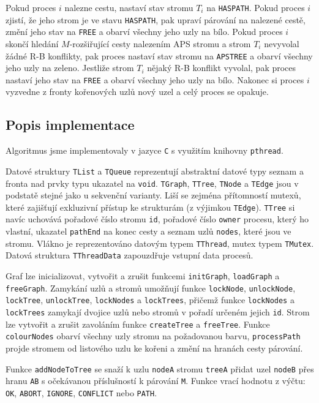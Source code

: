\documentclass[a4paper, 11pt, titlepage, final]{article}[3. prosinec 2011]
\begin{document}
Pokud proces $i$ nalezne cestu, nastaví stav stromu $T_i$ na \texttt{HASPATH}. Pokud proces $i$ zjistí, že jeho strom je ve stavu \texttt{HASPATH}, pak upraví párování na nalezené cestě, změní jeho stav na \texttt{FREE} a obarví všechny jeho uzly na bílo. Pokud proces $i$ skončí hledání $M$-rozšiřující cesty nalezením APS stromu a strom $T_i$ nevyvolal žádné R-B konflikty, pak proces nastaví stav stromu na \texttt{APSTREE} a obarví všechny jeho uzly na zeleno. Jestliže strom $T_i$ nějaký R-B konflikt vyvolal, pak proces nastaví jeho stav na \texttt{FREE} a obarví všechny jeho uzly na bílo. Nakonec si proces $i$ vyzvedne z fronty kořenových uzlů nový uzel a celý proces se opakuje.

\subsection{Popis implementace}

Algoritmus jsme implementovaly v jazyce \texttt{C} s využitím knihovny \texttt{pthread}. 

Datové struktury \texttt{TList} a \texttt{TQueue} reprezentují abstraktní datové typy seznam a fronta nad prvky typu ukazatel na \texttt{void}. \texttt{TGraph}, \texttt{TTree}, \texttt{TNode} a \texttt{TEdge} jsou v podstatě stejné jako u sekvenční varianty. Liší se zejména přítomností mutexů, které zajišťují exkluzivní přístup ke strukturám (z výjimkou \texttt{TEdge}). \texttt{TTree} si navíc uchovává pořadové číslo stromu \texttt{id}, pořadové číslo \texttt{owner} procesu, který ho vlastní, ukazatel \texttt{pathEnd} na konec cesty a seznam uzlů \texttt{nodes}, které jsou ve stromu. Vlákno je reprezentováno datovým typem \texttt{TThread}, mutex typem \texttt{TMutex}. Datová struktura \texttt{TThreadData} zapouzdřuje vstupní data procesů.

Graf lze inicializovat, vytvořit a zrušit funkcemi \texttt{initGraph}, \texttt{loadGraph} a \texttt{freeGraph}. Zamykání uzlů a stromů umožňují funkce \texttt{lockNode}, \texttt{unlockNode}, \texttt{lockTree}, \texttt{unlockTree}, \texttt{lockNodes} a \texttt{lockTrees}, přičemž funkce \texttt{lockNodes} a \texttt{lockTrees} zamykají dvojice uzlů nebo stromů v pořadí určeném jejich \texttt{id}. Strom lze vytvořit a zrušit zavoláním funkce \texttt{createTree} a \texttt{freeTree}. Funkce \texttt{colourNodes} obarví všechny uzly stromu na požadovanou barvu, \texttt{processPath} projde stromem od listového uzlu ke kořeni a změní na hranách cesty párování.

Funkce \texttt{addNodeToTree} se snaží k uzlu \texttt{nodeA} stromu \texttt{treeA} přidat uzel \texttt{nodeB} přes hranu \texttt{AB} s očekávanou příslušností k párování \texttt{M}. Funkce vrací hodnotu z výčtu: \texttt{OK}, \texttt{ABORT}, \texttt{IGNORE}, \texttt{CONFLICT} nebo \texttt{PATH}. 
\end{document}
